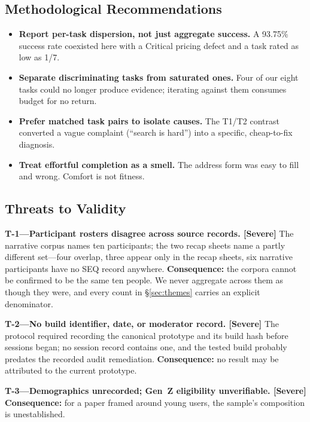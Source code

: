 \documentclass[conference]{IEEEtran}
\begin{document}
\subsection{Methodological Recommendations}

\begin{itemize}
\item \textbf{Report per-task dispersion, not just aggregate success.} A
93.75\% success rate coexisted here with a Critical pricing defect and a
task rated as low as 1/7.
\item \textbf{Separate discriminating tasks from saturated ones.} Four of
our eight tasks could no longer produce evidence; iterating against them
consumes budget for no return.
\item \textbf{Prefer matched task pairs to isolate causes.} The T1/T2
contrast converted a vague complaint (``search is hard'') into a specific,
cheap-to-fix diagnosis.
\item \textbf{Treat effortful completion as a smell.} The address form was
easy to fill and wrong. Comfort is not fitness.
\end{itemize}

\subsection{Threats to Validity}
\label{sec:threats}

\noindent\textbf{T-1---Participant rosters disagree across source records.
[Severe]} The narrative corpus names ten participants; the two recap
sheets name a partly different set---four overlap, three appear only in the
recap sheets, six narrative participants have no SEQ record anywhere.
\textbf{Consequence:} the corpora cannot be confirmed to be the same ten
people. We never aggregate across them as though they were, and every
count in \S\ref{sec:themes} carries an explicit denominator.

\medskip\noindent\textbf{T-2---No build identifier, date, or moderator record.
[Severe]} The protocol required recording the canonical prototype and its
build hash before sessions began; no session record contains one, and the
tested build probably predates the recorded audit remediation.
\textbf{Consequence:} no result may be attributed to the current
prototype.

\medskip\noindent\textbf{T-3---Demographics unrecorded; Gen~Z eligibility
unverifiable. [Severe]} \textbf{Consequence:} for a paper framed around
young users, the sample's composition is unestablished.
\end{document}
